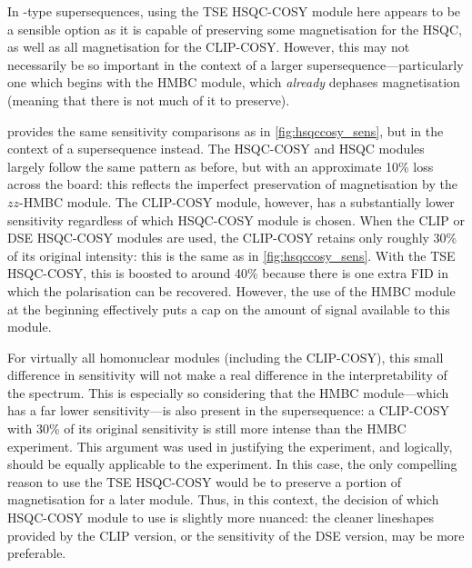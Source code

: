 In -type supersequences, using the TSE HSQC-COSY module here appears to be a sensible option as it is capable of preserving some  magnetisation for the HSQC, as well as all  magnetisation for the CLIP-COSY.
However, this may not necessarily be so important in the context of a larger supersequence---particularly one which begins with the HMBC module, which \textit{already} dephases  magnetisation (meaning that there is not much of it to preserve).

 provides the same sensitivity comparisons as in \cref{fig:hsqccosy_sens}, but in the context of a  supersequence instead.
The HSQC-COSY and HSQC modules largely follow the same pattern as before, but with an approximate 10\% loss across the board: this reflects the imperfect preservation of  magnetisation by the $zz$-HMBC module.
The CLIP-COSY module, however, has a substantially lower sensitivity regardless of which HSQC-COSY module is chosen.
When the CLIP or DSE HSQC-COSY modules are used, the CLIP-COSY retains only roughly 30\% of its original intensity: this is the same as in \cref{fig:hsqccosy_sens}.
With the TSE HSQC-COSY, this is boosted to around 40\% because there is one extra FID in which the  polarisation can be recovered.
However, the use of the HMBC module at the beginning effectively puts a cap on the amount of signal available to this module.

For virtually all homonuclear modules (including the CLIP-COSY), this small difference in sensitivity will not make a real difference in the interpretability of the spectrum.
This is especially so considering that the HMBC module---which has a far lower sensitivity---is also present in the supersequence:
a CLIP-COSY with 30\% of its original sensitivity is still more intense than the HMBC experiment.
This argument was used in justifying the  experiment, and logically, should be equally applicable to the  experiment.
In this case, the only compelling reason to use the TSE HSQC-COSY would be to preserve a portion of  magnetisation for a later \carbon{} module.
Thus, in this context, the decision of which HSQC-COSY module to use is slightly more nuanced: the cleaner lineshapes provided by the CLIP version, or the sensitivity of the DSE version, may be more preferable.
